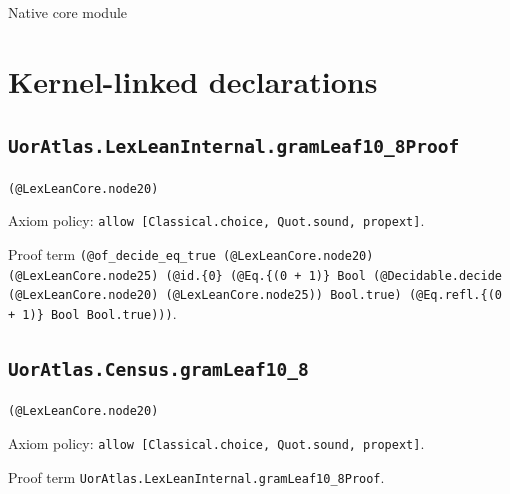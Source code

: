 \documentclass[11pt]{article}
\begin{document}
\begin{center}{\LARGE Native core module}\end{center}
\section*{Kernel-linked declarations}
\subsection*{\texttt{UorAtlas.LexLeanInternal.gramLeaf10\_8Proof}}
\noindent\texttt{(@LexLeanCore.node20)}\par
\noindent Axiom policy: \texttt{allow [Classical.choice, Quot.sound, propext]}.\par
\noindent Proof term \texttt{(@of\_decide\_eq\_true (@LexLeanCore.node20) (@LexLeanCore.node25) (@id.\{0\} (@Eq.\{(0 + 1)\} Bool (@Decidable.decide (@LexLeanCore.node20) (@LexLeanCore.node25)) Bool.true) (@Eq.refl.\{(0 + 1)\} Bool Bool.true)))}.\par
\subsection*{\texttt{UorAtlas.Census.gramLeaf10\_8}}
\noindent\texttt{(@LexLeanCore.node20)}\par
\noindent Axiom policy: \texttt{allow [Classical.choice, Quot.sound, propext]}.\par
\noindent Proof term \texttt{UorAtlas.LexLeanInternal.gramLeaf10\_8Proof}.\par
\end{document}
